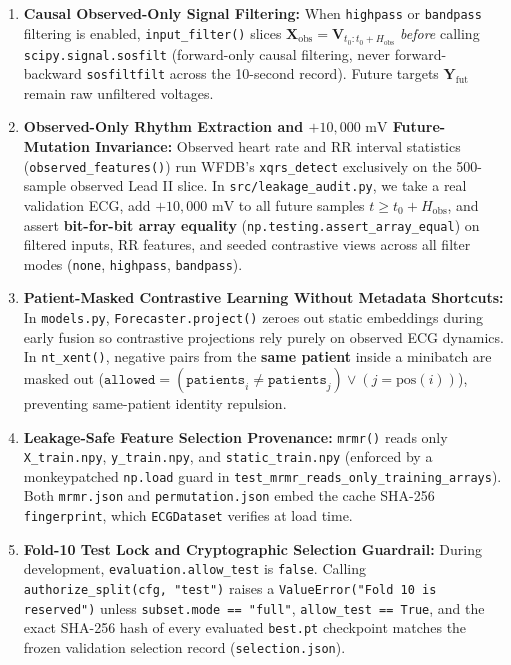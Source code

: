 \documentclass[11pt,a4paper]{article}
\begin{document}
\begin{enumerate}
    \item \textbf{Causal Observed-Only Signal Filtering:} When \texttt{highpass} or \texttt{bandpass} filtering is enabled, \texttt{input\_filter()} slices $\mathbf{X}_{\text{obs}} = \mathbf{V}_{t_0 : t_0 + H_{\text{obs}}}$ \emph{before} calling \texttt{scipy.signal.sosfilt} (forward-only causal filtering, never forward-backward \texttt{sosfiltfilt} across the 10-second record). Future targets $\mathbf{Y}_{\text{fut}}$ remain raw unfiltered voltages.
    \item \textbf{Observed-Only Rhythm Extraction and $+10{,}000\text{ mV}$ Future-Mutation Invariance:} Observed heart rate and RR interval statistics (\texttt{observed\_features()}) run WFDB's \texttt{xqrs\_detect} exclusively on the 500-sample observed Lead II slice. In \texttt{src/leakage\_audit.py}, we take a real validation ECG, add $+10{,}000\text{ mV}$ to all future samples $t \ge t_0 + H_{\text{obs}}$, and assert \textbf{bit-for-bit array equality} (\texttt{np.testing.assert\_array\_equal}) on filtered inputs, RR features, and seeded contrastive views across all filter modes (\texttt{none}, \texttt{highpass}, \texttt{bandpass}).
    \item \textbf{Patient-Masked Contrastive Learning Without Metadata Shortcuts:} In \texttt{models.py}, \texttt{Forecaster.project()} zeroes out static embeddings during early fusion so contrastive projections rely purely on observed ECG dynamics. In \texttt{nt\_xent()}, negative pairs from the \textbf{same patient} inside a minibatch are masked out ($\texttt{allowed} = (\texttt{patients}_i \neq \texttt{patients}_j) \lor (j = \text{pos}(i))$), preventing same-patient identity repulsion.
    \item \textbf{Leakage-Safe Feature Selection Provenance:} \texttt{mrmr()} reads only \texttt{X\_train.npy}, \texttt{y\_train.npy}, and \texttt{static\_train.npy} (enforced by a monkeypatched \texttt{np.load} guard in \texttt{test\_mrmr\_reads\_only\_training\_arrays}). Both \texttt{mrmr.json} and \texttt{permutation.json} embed the cache SHA-256 \texttt{fingerprint}, which \texttt{ECGDataset} verifies at load time.
    \item \textbf{Fold-10 Test Lock and Cryptographic Selection Guardrail:} During development, \texttt{evaluation.allow\_test} is \texttt{false}. Calling \texttt{authorize\_split(cfg, "test")} raises a \texttt{ValueError("Fold 10 is reserved")} unless \texttt{subset.mode == "full"}, \texttt{allow\_test == True}, and the exact SHA-256 hash of every evaluated \texttt{best.pt} checkpoint matches the frozen validation selection record (\texttt{selection.json}).
\end{enumerate}
\end{document}

